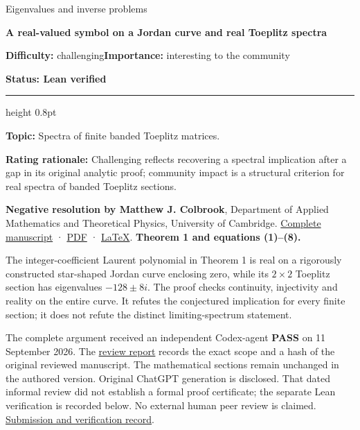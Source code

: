 \documentclass[11pt,a4paper]{article}
\makeatletter
\renewcommand{\subsection}{\Needspace{4\baselineskip}\@startsection{subsection}{2}{0pt}{9pt plus 1pt minus 1pt}{3pt}{\sffamily\bfseries\normalsize\color{ink}}}
\makeatother
\begin{document}
{\sffamily\small\color{muted}Eigenvalues and inverse problems\par}
\vspace{3pt}
{\raggedright{}\sffamily\bfseries\fontsize{21}{24}\selectfont\color{ink}A
real-valued symbol on a Jordan curve and real Toeplitz spectra\par}
\vspace{7pt}
{\sffamily\small\textbf{Difficulty:} challenging\quad\textbf{Importance:} interesting
to the community\par}
{\sffamily\small\bfseries\color{accent}Status: Lean verified\par}
\vspace{4pt}
{\color{accent}\hrule height 0.8pt}
\vspace{6pt}
\textbf{Topic:} Spectra of finite banded Toeplitz matrices.

\textbf{Rating rationale:} Challenging reflects recovering a spectral
implication after a gap in its original analytic proof; community impact
is a structural criterion for real spectra of banded Toeplitz sections.

\subsection{Resolution --- 2026-09-11}\label{resolution-2026-09-11}

\textbf{Negative resolution by Matthew J. Colbrook}, Department of
Applied Mathematics and Theoretical Physics, University of Cambridge.
\href{https://github.com/ajt60gaibb/OpenProblemsInNLA/blob/main/eigenvalues-and-inverse-problems/SP-06/solution.md}{Complete
manuscript} ·
\href{https://github.com/ajt60gaibb/OpenProblemsInNLA/blob/main/eigenvalues-and-inverse-problems/SP-06/solution.pdf}{PDF}
·
\href{https://github.com/ajt60gaibb/OpenProblemsInNLA/blob/main/eigenvalues-and-inverse-problems/SP-06/solution.tex}{LaTeX}.
\textbf{Theorem 1 and equations (1)--(8).}

The integer-coefficient Laurent polynomial in Theorem 1 is real on a
rigorously constructed star-shaped Jordan curve enclosing zero, while
its \(2\times2\) Toeplitz section has eigenvalues \(-128\pm8i\). The
proof checks continuity, injectivity and reality on the entire curve. It
refutes the conjectured implication for every finite section; it does
not refute the distinct limiting-spectrum statement.

The complete argument received an independent Codex-agent \textbf{PASS}
on 11 September 2026. The
\href{https://github.com/ajt60gaibb/OpenProblemsInNLA/blob/main/references/colbrook-additional-2026-09-11/verification/reviews/SP-06-review.md}{review
report} records the exact scope and a hash of the original reviewed
manuscript. The mathematical sections remain unchanged in the authored
version. Original ChatGPT generation is disclosed. That dated informal
review did not establish a formal proof certificate; the separate Lean
verification is recorded below. No external human peer review is
claimed.
\href{https://github.com/ajt60gaibb/OpenProblemsInNLA/blob/main/references/colbrook-additional-2026-09-11/README.md}{Submission
and verification record}.
\end{document}
